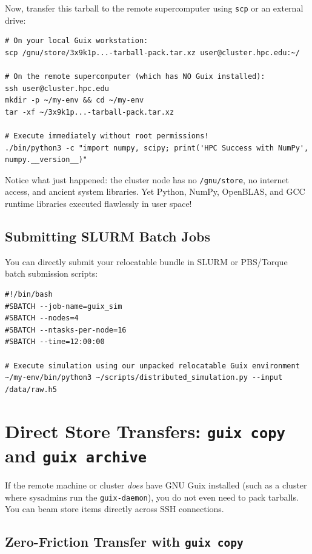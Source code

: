 Now, transfer this tarball to the remote supercomputer using \texttt{scp} or an external drive:

\begin{lstlisting}[style=guixcli]
# On your local Guix workstation:
scp /gnu/store/3x9k1p...-tarball-pack.tar.xz user@cluster.hpc.edu:~/

# On the remote supercomputer (which has NO Guix installed):
ssh user@cluster.hpc.edu
mkdir -p ~/my-env && cd ~/my-env
tar -xf ~/3x9k1p...-tarball-pack.tar.xz

# Execute immediately without root permissions!
./bin/python3 -c "import numpy, scipy; print('HPC Success with NumPy', numpy.__version__)"
\end{lstlisting}

Notice what just happened: the cluster node has no \texttt{/gnu/store}, no internet access, and ancient system libraries. Yet Python, NumPy, OpenBLAS, and GCC runtime libraries executed flawlessly in user space!

\subsection{Submitting SLURM Batch Jobs}

You can directly submit your relocatable bundle in SLURM or PBS/Torque batch submission scripts:

\begin{lstlisting}[style=guixcli]
#!/bin/bash
#SBATCH --job-name=guix_sim
#SBATCH --nodes=4
#SBATCH --ntasks-per-node=16
#SBATCH --time=12:00:00

# Execute simulation using our unpacked relocatable Guix environment
~/my-env/bin/python3 ~/scripts/distributed_simulation.py --input /data/raw.h5
\end{lstlisting}

\section{Direct Store Transfers: \texttt{guix copy} and \texttt{guix archive}}

If the remote machine or cluster \emph{does} have GNU Guix installed (such as a cluster where sysadmins run the \texttt{guix-daemon}), you do not even need to pack tarballs. You can beam store items directly across SSH connections.

\subsection{Zero-Friction Transfer with \texttt{guix copy}}

